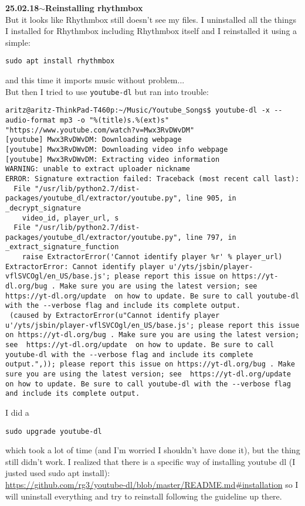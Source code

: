 \documentclass[11pt,a4paper]{article}
\newenvironment{loggentry}[2]%
{\noindent\textbf{#1}\hspace{1cm}$\mathbf{\sim}$\text{ }\textbf{#2}\\}{\vspace{0.5cm}}
\begin{document}
\begin{loggentry}{25.02.18}{Reinstalling rhythmbox}
But it looks like Rhythmbox still doesn't see my files. I uninstalled all the things I installed for Rhythmbox including Rhythmbox itself and I reinstalled it using a simple:
\begin{verbatim}
sudo apt install rhythmbox
\end{verbatim}
and this time it imports music without problem...\\
But then I tried to use \texttt{youtube-dl} but ran into trouble:
\begin{verbatim}
aritz@aritz-ThinkPad-T460p:~/Music/Youtube_Songs$ youtube-dl -x --audio-format mp3 -o "%(title)s.%(ext)s" "https://www.youtube.com/watch?v=Mwx3RvDWvDM"
[youtube] Mwx3RvDWvDM: Downloading webpage
[youtube] Mwx3RvDWvDM: Downloading video info webpage
[youtube] Mwx3RvDWvDM: Extracting video information
WARNING: unable to extract uploader nickname
ERROR: Signature extraction failed: Traceback (most recent call last):
  File "/usr/lib/python2.7/dist-packages/youtube_dl/extractor/youtube.py", line 905, in _decrypt_signature
    video_id, player_url, s
  File "/usr/lib/python2.7/dist-packages/youtube_dl/extractor/youtube.py", line 797, in _extract_signature_function
    raise ExtractorError('Cannot identify player %r' % player_url)
ExtractorError: Cannot identify player u'/yts/jsbin/player-vflSVCOgl/en_US/base.js'; please report this issue on https://yt-dl.org/bug . Make sure you are using the latest version; see  https://yt-dl.org/update  on how to update. Be sure to call youtube-dl with the --verbose flag and include its complete output.
 (caused by ExtractorError(u"Cannot identify player u'/yts/jsbin/player-vflSVCOgl/en_US/base.js'; please report this issue on https://yt-dl.org/bug . Make sure you are using the latest version; see  https://yt-dl.org/update  on how to update. Be sure to call youtube-dl with the --verbose flag and include its complete output.",)); please report this issue on https://yt-dl.org/bug . Make sure you are using the latest version; see  https://yt-dl.org/update  on how to update. Be sure to call youtube-dl with the --verbose flag and include its complete output.
\end{verbatim}
I did a 
\begin{verbatim}
sudo upgrade youtube-dl
\end{verbatim}
which took a lot of time (and I'm worried I shouldn't have done it), but the thing still didn't work. I realized that there is a specific way of installing youtube dl (I justed used sudo apt install):\\
\url{https://github.com/rg3/youtube-dl/blob/master/README.md#installation}
so I will uninstall everything and try to reinstall following the guideline up there.
\end{loggentry}
\end{document}
